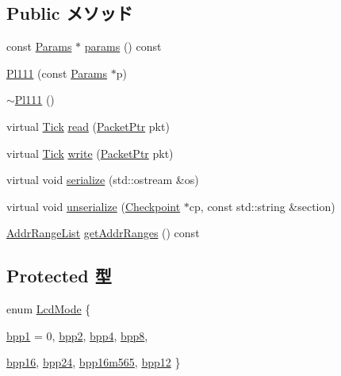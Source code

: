 \subsection*{Public メソッド}
\begin{DoxyCompactItemize}
\item 
const \hyperlink{classPl111_a98df8e62be26dfc2009a7e53d5d0841d}{Params} $\ast$ \hyperlink{classPl111_acd3c3feb78ae7a8f88fe0f110a718dff}{params} () const 
\item 
\hyperlink{classPl111_af9c40731047e4f40c32124db60dd4c19}{Pl111} (const \hyperlink{classPl111_a98df8e62be26dfc2009a7e53d5d0841d}{Params} $\ast$p)
\item 
\hyperlink{classPl111_a2f88fbe458a30b5dfef6be54275440b8}{$\sim$Pl111} ()
\item 
virtual \hyperlink{base_2types_8hh_a5c8ed81b7d238c9083e1037ba6d61643}{Tick} \hyperlink{classPl111_a613ec7d5e1ec64f8d21fec78ae8e568e}{read} (\hyperlink{classPacket}{PacketPtr} pkt)
\item 
virtual \hyperlink{base_2types_8hh_a5c8ed81b7d238c9083e1037ba6d61643}{Tick} \hyperlink{classPl111_a4cefab464e72b5dd42c003a0a4341802}{write} (\hyperlink{classPacket}{PacketPtr} pkt)
\item 
virtual void \hyperlink{classPl111_a53e036786d17361be4c7320d39c99b84}{serialize} (std::ostream \&os)
\item 
virtual void \hyperlink{classPl111_af22e5d6d660b97db37003ac61ac4ee49}{unserialize} (\hyperlink{classCheckpoint}{Checkpoint} $\ast$cp, const std::string \&section)
\item 
\hyperlink{classstd_1_1list}{AddrRangeList} \hyperlink{classPl111_a36cf113d5e5e091ebddb32306c098fae}{getAddrRanges} () const 
\end{DoxyCompactItemize}
\subsection*{Protected 型}
\begin{DoxyCompactItemize}
\item 
enum \hyperlink{classPl111_a1157b0263169abac7d7eab00e80cca3a}{LcdMode} \{ \par
\hyperlink{classPl111_a1157b0263169abac7d7eab00e80cca3aa80d4a9ded623571dc2bf1843152fcf6d}{bpp1} =  0, 
\hyperlink{classPl111_a1157b0263169abac7d7eab00e80cca3aa51abbeb798d9f152cf63dcb687c530e8}{bpp2}, 
\hyperlink{classPl111_a1157b0263169abac7d7eab00e80cca3aa56a6800b6c1d069ef0acdedd36327261}{bpp4}, 
\hyperlink{classPl111_a1157b0263169abac7d7eab00e80cca3aac3734ff232f25baa2ab373e3321b0254}{bpp8}, 
\par
\hyperlink{classPl111_a1157b0263169abac7d7eab00e80cca3aa0b1a1639893931871ebb837537ad4cc4}{bpp16}, 
\hyperlink{classPl111_a1157b0263169abac7d7eab00e80cca3aafdecf556751fc4485c4d9f735ee9fe6d}{bpp24}, 
\hyperlink{classPl111_a1157b0263169abac7d7eab00e80cca3aac3fbf139df7a9cbcb6b5d281abb13d5c}{bpp16m565}, 
\hyperlink{classPl111_a1157b0263169abac7d7eab00e80cca3aa3484d1f6c5067431bc197ef78e81d0af}{bpp12}
 \}
\end{DoxyCompactItemize}
